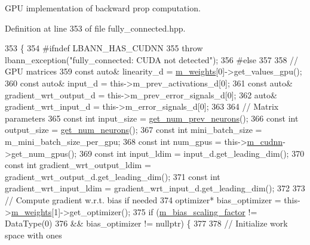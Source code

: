 G\+PU implementation of backward prop computation. 

Definition at line 353 of file fully\+\_\+connected.\+hpp.


\begin{DoxyCode}
353                          \{
354 \textcolor{preprocessor}{#ifndef LBANN\_HAS\_CUDNN}
355     \textcolor{keywordflow}{throw} lbann\_exception(\textcolor{stringliteral}{"fully\_connected: CUDA not detected"});
356 \textcolor{preprocessor}{#else}
357 
358     \textcolor{comment}{// GPU matrices}
359     \textcolor{keyword}{const} \textcolor{keyword}{auto}& linearity\_d = \hyperlink{classlbann_1_1Layer_a7954e30fbf9100a6ba4b56d02767a469}{m\_weights}[0]->get\_values\_gpu();
360     \textcolor{keyword}{const} \textcolor{keyword}{auto}& input\_d = this->m\_prev\_activations\_d[0];
361     \textcolor{keyword}{const} \textcolor{keyword}{auto}& gradient\_wrt\_output\_d = this->m\_prev\_error\_signals\_d[0];
362     \textcolor{keyword}{auto}& gradient\_wrt\_input\_d = this->m\_error\_signals\_d[0];
363     
364     \textcolor{comment}{// Matrix parameters}
365     \textcolor{keyword}{const} \textcolor{keywordtype}{int} input\_size = \hyperlink{classlbann_1_1Layer_a27112eb70bbfbd7f3c3e749960400dec}{get\_num\_prev\_neurons}();
366     \textcolor{keyword}{const} \textcolor{keywordtype}{int} output\_size = \hyperlink{classlbann_1_1Layer_aa4de686cc6c2dd38166f42faf874f227}{get\_num\_neurons}();
367     \textcolor{keyword}{const} \textcolor{keywordtype}{int} mini\_batch\_size = m\_mini\_batch\_size\_per\_gpu;
368     \textcolor{keyword}{const} \textcolor{keywordtype}{int} num\_gpus = this->\hyperlink{classlbann_1_1Layer_a08dbb94239e3b8c96329786c57c72e21}{m\_cudnn}->get\_num\_gpus();
369     \textcolor{keyword}{const} \textcolor{keywordtype}{int} input\_ldim = input\_d.get\_leading\_dim();
370     \textcolor{keyword}{const} \textcolor{keywordtype}{int} gradient\_wrt\_output\_ldim = gradient\_wrt\_output\_d.get\_leading\_dim();
371     \textcolor{keyword}{const} \textcolor{keywordtype}{int} gradient\_wrt\_input\_ldim = gradient\_wrt\_input\_d.get\_leading\_dim();
372 
373     \textcolor{comment}{// Compute gradient w.r.t. bias if needed}
374     optimizer* bias\_optimizer = this->\hyperlink{classlbann_1_1Layer_a7954e30fbf9100a6ba4b56d02767a469}{m\_weights}[1]->get\_optimizer();
375     \textcolor{keywordflow}{if} (\hyperlink{classlbann_1_1fully__connected__layer_ae02eaffd5528bf572883f8b06d1b40c0}{m\_bias\_scaling\_factor} != DataType(0)
376         && bias\_optimizer != \textcolor{keyword}{nullptr}) \{
377 
378       \textcolor{comment}{// Initialize work space with ones}

\end{DoxyCode}
